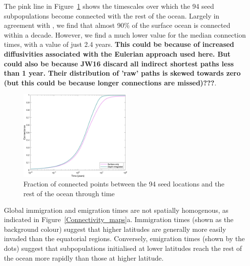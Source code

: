 \documentclass[12pt]{article}
\begin{document}
The pink line in Figure~\ref{Cumulative} shows the timescales over which the 94 seed subpopulations become connected with the rest of the ocean. Largely in agreement with \citet{Jonsson:2016}, we find that almost 90\% of the surface ocean is connected within a decade. However, we find a much lower value for the median connection times, with a value of just 2.4 years. \textbf{This could be because of increased diffusivities associated with the Eulerian approach used here. But could also be because JW16 discard all indirect shortest paths less than 1 year. Their distribution of 'raw' paths is skewed towards zero (but this could be because longer connections are missed)???}.

\begin{figure}[htp!]
    \centering
        \includegraphics[width=0.5\textwidth]{../Figures/cumulative_connections.png}
\caption{Fraction of connected points between the 94 seed locations and  the rest of the ocean through time}
\label{Cumulative}
\end{figure}

Global immigration and emigration times are not spatially homogenous, as indicated in Figure~\ref{Connectivity_maps}a. Immigration times (shown as the background colour) suggest that higher latitudes are generally more easily invaded than the equatorial regions. Conversely, emigration times (shown by the dots) suggest that subpopulations initialised at lower latitudes reach the rest of the ocean more rapidly than those at higher latitude. 
\end{document}
